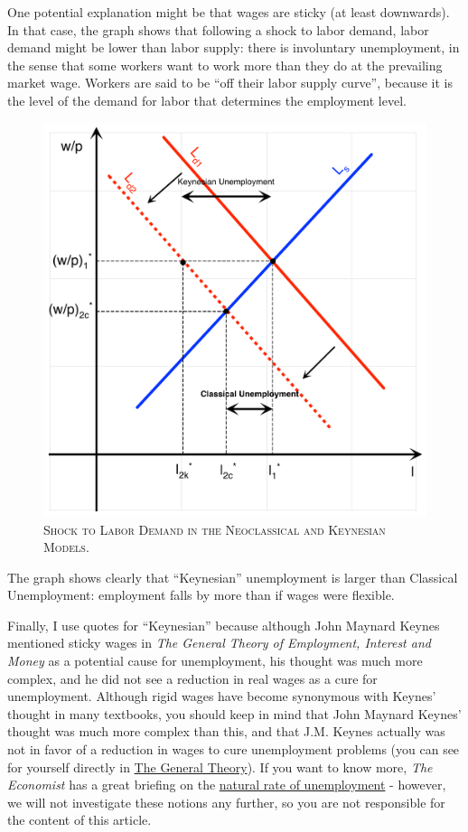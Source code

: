 \documentclass[]{book}
\begin{document}
One potential explanation might be that wages are sticky (at least
downwards). In that case, the graph shows that following a shock to
labor demand, labor demand might be lower than labor supply: there is
involuntary unemployment, in the sense that some workers want to work
more than they do at the prevailing market wage. Workers are said to be
``off their labor supply curve'', because it is the level of the demand
for labor that determines the employment level.




\begin{figure}

{\centering \includegraphics[width=0.75\linewidth,height=1\textheight]{graphsketcher/labor-market-productivity-shock-keynes} 

}

\caption{\textsc{Shock to Labor Demand in the
Neoclassical and Keynesian Models}.}\label{fig:shock-labor-demand}
\end{figure}

The graph shows clearly that ``Keynesian'' unemployment is larger than
Classical Unemployment: employment falls by more than if wages were
flexible.

Finally, I use quotes for ``Keynesian'' because although John Maynard
Keynes mentioned sticky wages in \emph{The General Theory of Employment,
Interest and Money} as a potential cause for unemployment, his thought
was much more complex, and he did not see a reduction in real wages as a
cure for unemployment. Although rigid wages have become synonymous with
Keynes' thought in many textbooks, you should keep in mind that John
Maynard Keynes' thought was much more complex than this, and that J.M.
Keynes actually was not in favor of a reduction in wages to cure
unemployment problems (you can see for yourself directly in
\href{http://cas2.umkc.edu/economics/people/facultypages/kregel/courses/econ645/winter2011/generaltheory.pdf}{The
General Theory}). If you want to know more, \emph{The Economist} has a
great briefing on the
\href{https://www.economist.com/economics-brief/2017/08/26/the-natural-rate-of-unemployment}{natural
rate of unemployment} - however, we will not investigate these notions
any further, so you are not responsible for the content of this article.
\end{document}
